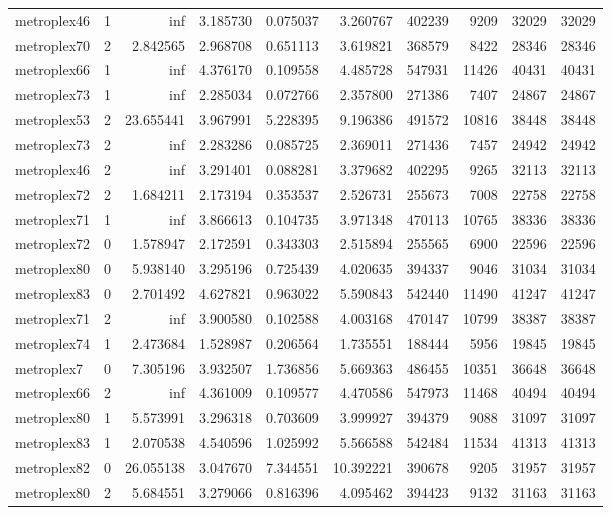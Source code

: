 \begin{longtable}{|l|r|r|r|r|r|r|r|r|r|}
metroplex46 & 1 & inf & 3.185730 & 0.075037 & 3.260767 & 402239 & 9209 & 32029 & 32029 \\
metroplex70 & 2 & 2.842565 & 2.968708 & 0.651113 & 3.619821 & 368579 & 8422 & 28346 & 28346 \\
metroplex66 & 1 & inf & 4.376170 & 0.109558 & 4.485728 & 547931 & 11426 & 40431 & 40431 \\
metroplex73 & 1 & inf & 2.285034 & 0.072766 & 2.357800 & 271386 & 7407 & 24867 & 24867 \\
metroplex53 & 2 & 23.655441 & 3.967991 & 5.228395 & 9.196386 & 491572 & 10816 & 38448 & 38448 \\
metroplex73 & 2 & inf & 2.283286 & 0.085725 & 2.369011 & 271436 & 7457 & 24942 & 24942 \\
metroplex46 & 2 & inf & 3.291401 & 0.088281 & 3.379682 & 402295 & 9265 & 32113 & 32113 \\
metroplex72 & 2 & 1.684211 & 2.173194 & 0.353537 & 2.526731 & 255673 & 7008 & 22758 & 22758 \\
metroplex71 & 1 & inf & 3.866613 & 0.104735 & 3.971348 & 470113 & 10765 & 38336 & 38336 \\
metroplex72 & 0 & 1.578947 & 2.172591 & 0.343303 & 2.515894 & 255565 & 6900 & 22596 & 22596 \\
metroplex80 & 0 & 5.938140 & 3.295196 & 0.725439 & 4.020635 & 394337 & 9046 & 31034 & 31034 \\
metroplex83 & 0 & 2.701492 & 4.627821 & 0.963022 & 5.590843 & 542440 & 11490 & 41247 & 41247 \\
metroplex71 & 2 & inf & 3.900580 & 0.102588 & 4.003168 & 470147 & 10799 & 38387 & 38387 \\
metroplex74 & 1 & 2.473684 & 1.528987 & 0.206564 & 1.735551 & 188444 & 5956 & 19845 & 19845 \\
metroplex7 & 0 & 7.305196 & 3.932507 & 1.736856 & 5.669363 & 486455 & 10351 & 36648 & 36648 \\
metroplex66 & 2 & inf & 4.361009 & 0.109577 & 4.470586 & 547973 & 11468 & 40494 & 40494 \\
metroplex80 & 1 & 5.573991 & 3.296318 & 0.703609 & 3.999927 & 394379 & 9088 & 31097 & 31097 \\
metroplex83 & 1 & 2.070538 & 4.540596 & 1.025992 & 5.566588 & 542484 & 11534 & 41313 & 41313 \\
metroplex82 & 0 & 26.055138 & 3.047670 & 7.344551 & 10.392221 & 390678 & 9205 & 31957 & 31957 \\
metroplex80 & 2 & 5.684551 & 3.279066 & 0.816396 & 4.095462 & 394423 & 9132 & 31163 & 31163 \\

\end{longtable}
